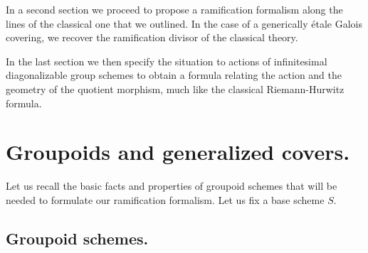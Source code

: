 \documentclass{amsart}
\theoremstyle{definition}
\theoremstyle{remark}
\begin{document}
In a second section we proceed to propose a ramification formalism along the lines of the classical one that we outlined. In the case of a generically \'etale Galois covering, we recover the ramification divisor of the classical theory.

 
In the last section we then specify the situation to actions of infinitesimal diagonalizable group schemes to obtain a formula relating the action and the geometry of the quotient morphism, much like the classical Riemann-Hurwitz formula. 

\newpage

\section{Groupoids and generalized covers.}

Let us recall the basic facts and properties of groupoid schemes that will be needed to formulate our ramification formalism. Let us fix a base scheme $S$.

\subsection{Groupoid schemes.}
\end{document}

